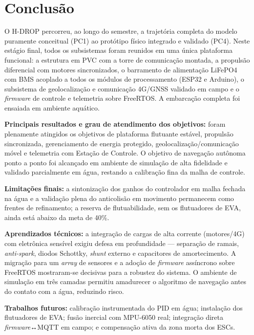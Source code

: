 \documentclass[12pt,a4paper]{article}
\begin{document}
\section{Conclusão}

O H-DROP percorreu, ao longo do semestre, a trajetória completa do modelo puramente conceitual (PC1) ao protótipo físico integrado e validado (PC4). Neste estágio final, todos os subsistemas foram reunidos em uma única plataforma funcional: a estrutura em PVC com a torre de comunicação montada, a propulsão diferencial com motores sincronizados, o barramento de alimentação LiFePO4 com BMS acoplado a todos os módulos de processamento (ESP32 e Arduino), o subsistema de geolocalização e comunicação 4G/GNSS validado em campo e o \textit{firmware} de controle e telemetria sobre FreeRTOS. A embarcação completa foi ensaiada em ambiente aquático.

\textbf{Principais resultados e grau de atendimento dos objetivos:} foram plenamente atingidos os objetivos de plataforma flutuante estável, propulsão sincronizada, gerenciamento de energia protegido, geolocalização/comunicação móvel e telemetria com Estação de Controle. O objetivo de navegação autônoma ponto a ponto foi alcançado em ambiente de simulação de alta fidelidade e validado parcialmente em água, restando a calibração fina da malha de controle.

\textbf{Limitações finais:} a sintonização dos ganhos do controlador em malha fechada na água e a validação plena do anticolisão em movimento permanecem como frentes de refinamento; a reserva de flutuabilidade, sem os flutuadores de EVA, ainda está abaixo da meta de 40\%.

\textbf{Aprendizados técnicos:} a integração de cargas de alta corrente (motores/4G) com eletrônica sensível exigiu defesa em profundidade — separação de ramais, \textit{anti-spark}, diodos Schottky, \textit{shunt} externo e capacitores de amortecimento. A migração para um \textit{array} de sensores e a adoção de \textit{firmware} assíncrono sobre FreeRTOS mostraram-se decisivas para a robustez do sistema. O ambiente de simulação em três camadas permitiu amadurecer o algoritmo de navegação antes do contato com a água, reduzindo risco.

\textbf{Trabalhos futuros:} calibração instrumentada do PID em água; instalação dos flutuadores de EVA; fusão inercial com MPU-6050 real; integração direta \textit{firmware}↔MQTT em campo; e compensação ativa da zona morta dos ESCs.
\end{document}
